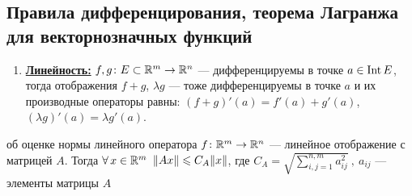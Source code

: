 \subsection{Правила дифференцирования, теорема Лагранжа для векторнозначных функций}

\begin{enumerate} %
	\item \href{https://www.youtube.com/live/9KZRjeVTXNY?si=Hcxa5JDA7wVkfMRg&t=7995}{\textbf{Линейность:}}
	$f, g\colon E\subset\mathbb R^m \to \mathbb R^n$ --- дифференцируемы в точке $a \in \mathrm{Int}\, E$,
	тогда отображения $f + g$, $\lambda g$ --- тоже дифференцируемы в точке $a$ 
	и их производные операторы равны: 
	$(f + g)'(a) = f'(a) + g'(a)$, 
	$(\lambda g)'(a) = \lambda g'(a)$.
\end{enumerate}

\begin{lem}[https://www.youtube.com/live/9KZRjeVTXNY?si=-WLmW4M02oNemOzS&t=8181]{об оценке нормы линейного оператора}\label{оц.нормы}
	$f\colon \mathbb R^m \to \mathbb R^n$ --- линейное отображение с матрицей $A$. Тогда $\forall \, x \in \mathbb R^m$ $\|Ax\|\leqslant C_A \|x\|$, где $C_A = \sqrt{\sum\limits_{i, j = 1}^{n, m}a_{ij}^2}\ ,\ a_{ij}$ --- элементы матрицы $A$
\end{lem} %

